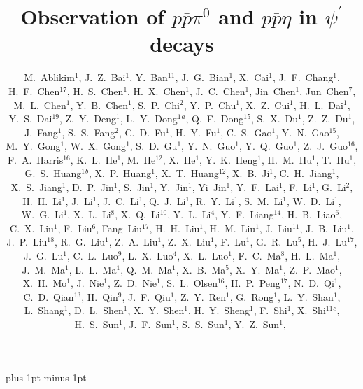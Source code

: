 \documentclass[prd,twocolumn,showpacs,amsmath,amssymb]{revtex4}
\newcommand{\psp}{\psi^\prime}
\newcommand{\piz}{\pi^0}
\newcommand{\ppb}{p\overline{p}}
\begin{document}
\normalsize
\parskip=5pt plus 1pt minus 1pt

\title{\boldmath Observation of $\ppb\piz$ and $\ppb\eta$ in $\psp$ decays}
\author{
M.~Ablikim$^{1}$,      J.~Z.~Bai$^{1}$,       Y.~Ban$^{11}$,
J.~G.~Bian$^{1}$,      X.~Cai$^{1}$,          J.~F.~Chang$^{1}$,
H.~F.~Chen$^{17}$,     H.~S.~Chen$^{1}$,      H.~X.~Chen$^{1}$,
J.~C.~Chen$^{1}$,      Jin~Chen$^{1}$,        Jun~Chen$^{7}$,
M.~L.~Chen$^{1}$,      Y.~B.~Chen$^{1}$,      S.~P.~Chi$^{2}$,
Y.~P.~Chu$^{1}$,       X.~Z.~Cui$^{1}$,       H.~L.~Dai$^{1}$,
Y.~S.~Dai$^{19}$,      Z.~Y.~Deng$^{1}$,      L.~Y.~Dong$^{1}$$^a$,
Q.~F.~Dong$^{15}$,     S.~X.~Du$^{1}$,        Z.~Z.~Du$^{1}$,
J.~Fang$^{1}$,         S.~S.~Fang$^{2}$,      C.~D.~Fu$^{1}$,
H.~Y.~Fu$^{1}$,        C.~S.~Gao$^{1}$,       Y.~N.~Gao$^{15}$,
M.~Y.~Gong$^{1}$,      W.~X.~Gong$^{1}$,      S.~D.~Gu$^{1}$,
Y.~N.~Guo$^{1}$,       Y.~Q.~Guo$^{1}$,       Z.~J.~Guo$^{16}$,
F.~A.~Harris$^{16}$,   K.~L.~He$^{1}$,        M.~He$^{12}$,
X.~He$^{1}$,           Y.~K.~Heng$^{1}$,      H.~M.~Hu$^{1}$,
T.~Hu$^{1}$,           G.~S.~Huang$^{1}$$^b$, X.~P.~Huang$^{1}$,
X.~T.~Huang$^{12}$,    X.~B.~Ji$^{1}$,        C.~H.~Jiang$^{1}$,
X.~S.~Jiang$^{1}$,     D.~P.~Jin$^{1}$,       S.~Jin$^{1}$,
Y.~Jin$^{1}$,          Yi~Jin$^{1}$,          Y.~F.~Lai$^{1}$,
F.~Li$^{1}$,           G.~Li$^{2}$,           H.~H.~Li$^{1}$,
J.~Li$^{1}$,           J.~C.~Li$^{1}$,        Q.~J.~Li$^{1}$,
R.~Y.~Li$^{1}$,        S.~M.~Li$^{1}$,        W.~D.~Li$^{1}$,
W.~G.~Li$^{1}$,        X.~L.~Li$^{8}$,        X.~Q.~Li$^{10}$,
Y.~L.~Li$^{4}$,        Y.~F.~Liang$^{14}$,    H.~B.~Liao$^{6}$,
C.~X.~Liu$^{1}$,       F.~Liu$^{6}$,          Fang~Liu$^{17}$,
H.~H.~Liu$^{1}$,       H.~M.~Liu$^{1}$,       J.~Liu$^{11}$,
J.~B.~Liu$^{1}$,       J.~P.~Liu$^{18}$,      R.~G.~Liu$^{1}$,
Z.~A.~Liu$^{1}$,       Z.~X.~Liu$^{1}$,       F.~Lu$^{1}$,
G.~R.~Lu$^{5}$,        H.~J.~Lu$^{17}$,       J.~G.~Lu$^{1}$,
C.~L.~Luo$^{9}$,       L.~X.~Luo$^{4}$,       X.~L.~Luo$^{1}$,
F.~C.~Ma$^{8}$,        H.~L.~Ma$^{1}$,        J.~M.~Ma$^{1}$,
L.~L.~Ma$^{1}$,        Q.~M.~Ma$^{1}$,        X.~B.~Ma$^{5}$,
X.~Y.~Ma$^{1}$,        Z.~P.~Mao$^{1}$,       X.~H.~Mo$^{1}$,
J.~Nie$^{1}$,          Z.~D.~Nie$^{1}$,       S.~L.~Olsen$^{16}$,
H.~P.~Peng$^{17}$,     N.~D.~Qi$^{1}$,        C.~D.~Qian$^{13}$,
H.~Qin$^{9}$,          J.~F.~Qiu$^{1}$,       Z.~Y.~Ren$^{1}$,
G.~Rong$^{1}$,         L.~Y.~Shan$^{1}$,      L.~Shang$^{1}$,
D.~L.~Shen$^{1}$,      X.~Y.~Shen$^{1}$,      H.~Y.~Sheng$^{1}$,
F.~Shi$^{1}$,          X.~Shi$^{11}$$^c$,         H.~S.~Sun$^{1}$,
J.~F.~Sun$^{1}$,       S.~S.~Sun$^{1}$,       Y.~Z.~Sun$^{1}$,
$$}
\end{document}
